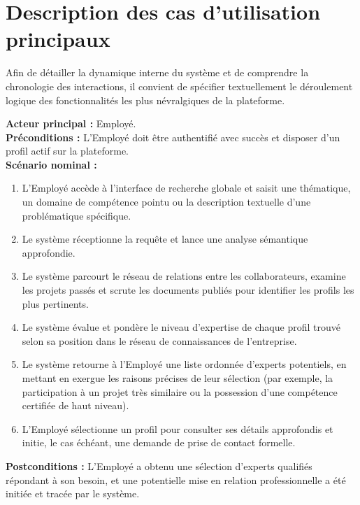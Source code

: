 \documentclass[12pt,a4paper]{article}
\begin{document}
\section{Description des cas d'utilisation principaux}

Afin de détailler la dynamique interne du système et de comprendre la chronologie des interactions, il convient de spécifier textuellement le déroulement logique des fonctionnalités les plus névralgiques de la plateforme.

\begin{tcolorbox}[colback=bleu!5,colframe=bleu,title=Cas d'utilisation 1 : Recherche d'expert]
\textbf{Acteur principal :} Employé. \\
\textbf{Préconditions :} L'Employé doit être authentifié avec succès et disposer d'un profil actif sur la plateforme. \\
\textbf{Scénario nominal :}
\begin{enumerate}
    \item L'Employé accède à l'interface de recherche globale et saisit une thématique, un domaine de compétence pointu ou la description textuelle d'une problématique spécifique.
    \item Le système réceptionne la requête et lance une analyse sémantique approfondie.
    \item Le système parcourt le réseau de relations entre les collaborateurs, examine les projets passés et scrute les documents publiés pour identifier les profils les plus pertinents.
    \item Le système évalue et pondère le niveau d'expertise de chaque profil trouvé selon sa position dans le réseau de connaissances de l'entreprise.
    \item Le système retourne à l'Employé une liste ordonnée d'experts potentiels, en mettant en exergue les raisons précises de leur sélection (par exemple, la participation à un projet très similaire ou la possession d'une compétence certifiée de haut niveau).
    \item L'Employé sélectionne un profil pour consulter ses détails approfondis et initie, le cas échéant, une demande de prise de contact formelle.
\end{enumerate}
\textbf{Postconditions :} L'Employé a obtenu une sélection d'experts qualifiés répondant à son besoin, et une potentielle mise en relation professionnelle a été initiée et tracée par le système.
\end{tcolorbox}
\end{document}
